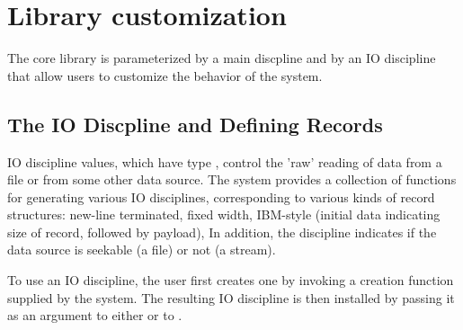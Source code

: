 \chapter{Library customization}
\label{chap:library-customization}
The \pads{} core library is parameterized by a main discpline and by
an IO discipline that allow users to customize the behavior of the
system.

\section{The IO Discpline and Defining Records}
IO discipline values, which have type , control the
'raw' reading of data from a file or from some other data source.  
The \pads{} system provides a collection of functions for generating
various IO disciplines, corresponding to various kinds of record
structures: new-line terminated, fixed width, IBM-style (initial data
indicating size of record, followed by payload), \etc{}  In addition,
the discipline indicates if the data source is seekable (a file) or
not (a stream).

To use an IO discipline, the user first creates one by invoking
a creation function supplied by the \pads{} system.  The resulting IO
discipline is then installed by passing it as an argument to either
 or to .

